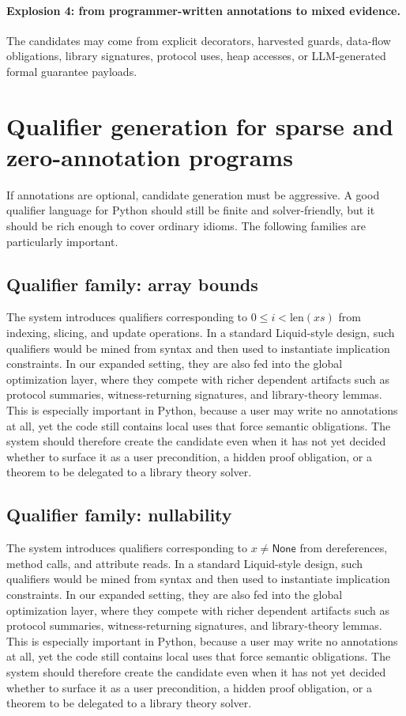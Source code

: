\documentclass[11pt]{article}
\theoremstyle{definition}
\theoremstyle{plain}
\begin{document}
\paragraph{Explosion 4: from programmer-written annotations to mixed evidence.}
The candidates may come from explicit decorators, harvested guards, data-flow
obligations, library signatures, protocol uses, heap accesses, or LLM-generated
formal guarantee payloads.


\section{Qualifier generation for sparse and zero-annotation programs}

If annotations are optional, candidate generation must be aggressive. A good
qualifier language for Python should still be finite and solver-friendly, but it
should be rich enough to cover ordinary idioms. The following families are
particularly important.
\subsection{Qualifier family: array bounds}
The system introduces qualifiers corresponding to \(0 \le i < \mathrm{len}(xs)\) from indexing, slicing, and update operations. In a standard
Liquid-style design, such qualifiers would be mined from syntax and then used
to instantiate implication constraints. In our expanded setting, they are also
fed into the global optimization layer, where they compete with richer
dependent artifacts such as protocol summaries, witness-returning signatures,
and library-theory lemmas. This is especially important in Python, because a
user may write no annotations at all, yet the code still contains local uses
that force semantic obligations. The system should therefore create the
candidate even when it has not yet decided whether to surface it as a user
precondition, a hidden proof obligation, or a theorem to be delegated to a
library theory solver.

\subsection{Qualifier family: nullability}
The system introduces qualifiers corresponding to \(x \neq \mathsf{None}\) from dereferences, method calls, and attribute reads. In a standard
Liquid-style design, such qualifiers would be mined from syntax and then used
to instantiate implication constraints. In our expanded setting, they are also
fed into the global optimization layer, where they compete with richer
dependent artifacts such as protocol summaries, witness-returning signatures,
and library-theory lemmas. This is especially important in Python, because a
user may write no annotations at all, yet the code still contains local uses
that force semantic obligations. The system should therefore create the
candidate even when it has not yet decided whether to surface it as a user
precondition, a hidden proof obligation, or a theorem to be delegated to a
library theory solver.
\end{document}
